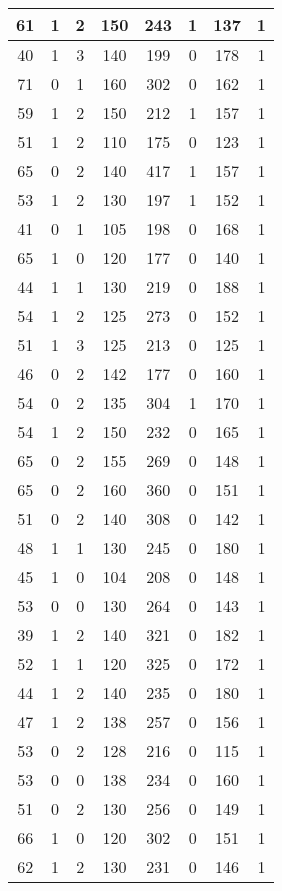 \documentclass{article}
\begin{document}
\begin{longtable}{|c|c|c|c|c|c|c|c|}
61 & 1 & 2 & 150 & 243 & 1 & 137 & 1 \\ \hline
40 & 1 & 3 & 140 & 199 & 0 & 178 & 1 \\ \hline
71 & 0 & 1 & 160 & 302 & 0 & 162 & 1 \\ \hline
59 & 1 & 2 & 150 & 212 & 1 & 157 & 1 \\ \hline
51 & 1 & 2 & 110 & 175 & 0 & 123 & 1 \\ \hline
65 & 0 & 2 & 140 & 417 & 1 & 157 & 1 \\ \hline
53 & 1 & 2 & 130 & 197 & 1 & 152 & 1 \\ \hline
41 & 0 & 1 & 105 & 198 & 0 & 168 & 1 \\ \hline
65 & 1 & 0 & 120 & 177 & 0 & 140 & 1 \\ \hline
44 & 1 & 1 & 130 & 219 & 0 & 188 & 1 \\ \hline
54 & 1 & 2 & 125 & 273 & 0 & 152 & 1 \\ \hline
51 & 1 & 3 & 125 & 213 & 0 & 125 & 1 \\ \hline
46 & 0 & 2 & 142 & 177 & 0 & 160 & 1 \\ \hline
54 & 0 & 2 & 135 & 304 & 1 & 170 & 1 \\ \hline
54 & 1 & 2 & 150 & 232 & 0 & 165 & 1 \\ \hline
65 & 0 & 2 & 155 & 269 & 0 & 148 & 1 \\ \hline
65 & 0 & 2 & 160 & 360 & 0 & 151 & 1 \\ \hline
51 & 0 & 2 & 140 & 308 & 0 & 142 & 1 \\ \hline
48 & 1 & 1 & 130 & 245 & 0 & 180 & 1 \\ \hline
45 & 1 & 0 & 104 & 208 & 0 & 148 & 1 \\ \hline
53 & 0 & 0 & 130 & 264 & 0 & 143 & 1 \\ \hline
39 & 1 & 2 & 140 & 321 & 0 & 182 & 1 \\ \hline
52 & 1 & 1 & 120 & 325 & 0 & 172 & 1 \\ \hline
44 & 1 & 2 & 140 & 235 & 0 & 180 & 1 \\ \hline
47 & 1 & 2 & 138 & 257 & 0 & 156 & 1 \\ \hline
53 & 0 & 2 & 128 & 216 & 0 & 115 & 1 \\ \hline
53 & 0 & 0 & 138 & 234 & 0 & 160 & 1 \\ \hline
51 & 0 & 2 & 130 & 256 & 0 & 149 & 1 \\ \hline
66 & 1 & 0 & 120 & 302 & 0 & 151 & 1 \\ \hline
62 & 1 & 2 & 130 & 231 & 0 & 146 & 1 \\ \hline

\end{longtable}
\end{document}
